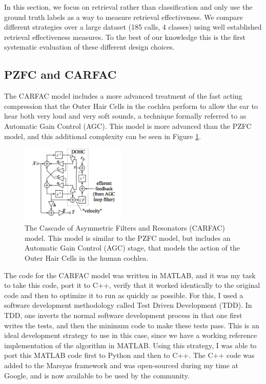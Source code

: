 \documentclass[12pt,oneside]{book}
\begin{document}
In this section, we focus on retrieval rather than classification and
only use the ground truth labels as a way to measure retrieval
effectiveness. We compare different strategies over a large dataset
(185 calls, 4 classes) using well established retrieval effectiveness
measures. To the best of our knowledge this is the first systematic
evaluation of these different design choices.

\subsection{PZFC and CARFAC}
The CARFAC model includes a more advanced treatment of the fast acting
compression that the Outer Hair Cells in the cochlea perform to allow
the ear to hear both very loud and very soft sounds, a technique
formally referred to as Automatic Gain Control (AGC).  This model is
more advanced than the PZFC model, and this additional complexity can
be seen in Figure \ref{fig:dspcarfac}.

\begin{figure}[t]
\begin{center}
\includegraphics[width=50mm]{figures/dspcarfac}
\caption{
The Cascade of Asymmetric Filters and Resonators (CARFAC) model.  This
model is similar to the PZFC model, but includes an Automatic Gain
Control (AGC) stage, that models the action of the Outer Hair Cells in
the human cochlea.} 
\label{fig:dspcarfac} 
\end{center} 
\end{figure} 


The code for the CARFAC model was written in MATLAB, and it was my
task to take this code, port it to C++, verify that it worked
identically to the original code and then to optimize it to run as
quickly as possible.  For this, I used a software development
methodology called Test Driven Development \cite{fraser03} (TDD).  In
TDD, one inverts the normal software development process in that one
first writes the tests, and then the minimum code to make these tests
pass.  This is an ideal development strategy to use in this case,
since we have a working reference implementation of the algorithm in
MATLAB.  Using this strategy, I was able to port this MATLAB code
first to Python and then to C++.  The C++ code was added to the
Marsyas \cite{marsyas} framework and was open-sourced during my time
at Google, and is now available to be used by the community.
\end{document}
